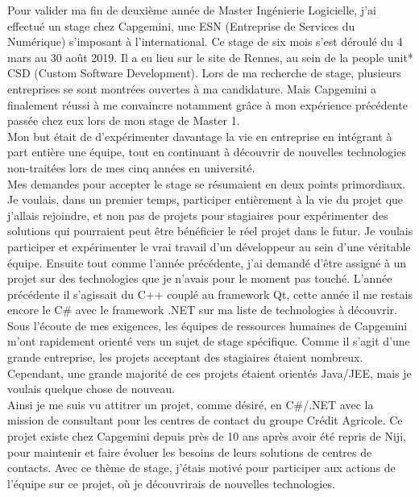 \documentclass{rapport}
\begin{document}
Pour valider ma fin de deuxième année de Master Ingénierie Logicielle, j'ai effectué un stage chez Capgemini, une ESN (Entreprise de Services du Numérique) s'imposant à l'international. Ce stage de six mois s'est déroulé du 4 mars au 30 août 2019. Il a eu lieu sur le site de Rennes, au sein de la people unit* CSD (Custom Software Development).
Lors de ma recherche de stage, plusieurs entreprises se sont montrées ouvertes à ma candidature. Mais Capgemini a finalement réussi à me convaincre notamment grâce à mon expérience précédente passée chez eux lors de mon stage de Master 1.
\\

Mon but était de d'expérimenter davantage la vie en entreprise en intégrant à part entière une équipe, tout en continuant à découvrir de nouvelles technologies non-traitées lors de mes cinq années en université.
\\
Mes demandes pour accepter le stage se résumaient en deux points primordiaux.
Je voulais, dans un premier temps, participer entièrement à la vie du projet que j'allais rejoindre, et non pas de projets pour stagiaires pour expérimenter des solutions qui pourraient peut être bénéficier le réel projet dans le futur. Je voulais participer et expérimenter le vrai travail d'un développeur au sein d'une véritable équipe.
Ensuite tout comme l'année précédente, j'ai demandé d'être assigné à un projet sur des technologies que je n'avais pour le moment pas touché. L'année précédente il s'agissait du C++ couplé au framework Qt, cette année il me restais encore le C\# avec le framework .NET sur ma liste de technologies à découvrir.\\
Sous l'écoute de mes exigences, les équipes de ressources humaines de Capgemini m'ont rapidement orienté vers un sujet de stage spécifique. Comme il s'agit d'une grande entreprise, les projets acceptant des stagiaires étaient nombreux. Cependant, une grande majorité de ces projets étaient orientés Java/JEE, mais je voulais quelque chose de nouveau.\\

Ainsi je me suis vu attitrer un projet, comme désiré, en C\#/.NET avec la mission de consultant pour les centres de contact du groupe Crédit Agricole. Ce projet existe chez Capgemini depuis près de 10 ans après avoir été repris de Niji, pour maintenir et faire évoluer les besoins de leurs solutions de centres de contacts. Avec ce thème de stage, j'étais motivé pour participer aux actions de l'équipe sur ce projet, où je découvrirais de nouvelles technologies.
\end{document}
